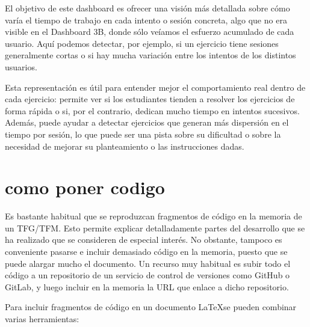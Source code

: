 \documentclass[a4paper, 12pt]{book}
\begin{document}
El objetivo de este dashboard es ofrecer una visión más detallada sobre cómo varía el tiempo de trabajo en cada intento o sesión concreta, algo que no era visible en el Dashboard 3B, donde sólo veíamos el esfuerzo acumulado de cada usuario. Aquí podemos detectar, por ejemplo, si un ejercicio tiene sesiones generalmente cortas o si hay mucha variación entre los intentos de los distintos usuarios.

Esta representación es útil para entender mejor el comportamiento real dentro de cada ejercicio: permite ver si los estudiantes tienden a resolver los ejercicios de forma rápida o si, por el contrario, dedican mucho tiempo en intentos sucesivos. Además, puede ayudar a detectar ejercicios que generan más dispersión en el tiempo por sesión, lo que puede ser una pista sobre su dificultad o sobre la necesidad de mejorar su planteamiento o las instrucciones dadas.

\section{como poner codigo}


Es bastante habitual que se reproduzcan fragmentos de código en la memoria de un TFG/TFM.
Esto permite explicar detalladamente partes del desarrollo que se ha realizado que se consideren
de especial interés. No obstante, tampoco es conveniente pasarse e incluir demasiado código en
la memoria, puesto que se puede alargar mucho el documento. Un recurso muy habitual es subir
todo el código a un repositorio de un servicio de control de versiones como GitHub o GitLab,
y luego incluir en la memoria la URL que enlace a dicho repositorio.





Para incluir fragmentos de código en un documento \LaTeX se pueden combinar varias
herramientas:

\end{document}
